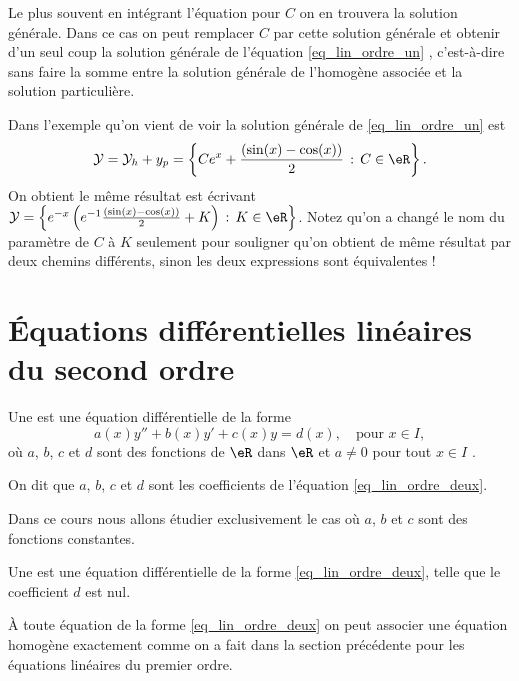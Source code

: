 \begin{remark}
	Le plus souvent en intégrant l'équation pour $C$ on en trouvera la solution générale. Dans ce cas on peut remplacer $C$ par cette solution générale et obtenir d'un seul coup la solution générale de l'équation \eqref{eq_lin_ordre_un} , c'est-à-dire sans faire la somme entre la solution générale de l'homogène associée et la solution particulière.

	\begin{example}
		Dans l'exemple qu'on vient de voir la solution générale de \eqref{eq_lin_ordre_un} est
		\begin{equation}
			\mathcal{Y} = \mathcal{Y}_h + y_p = \left\{Ce^x + \frac{(\sin(x)-\cos(x))}{2} \,:\, C\in\eR\right\}.
		\end{equation}
		On obtient le m\^eme résultat est écrivant $\mathcal{Y} = \left\{e^{-x}\left(e^{-1}\frac{(\sin(x)-\cos(x))}{2} +K \right) \,:\, K\in\eR\right\}$. Notez qu'on a changé le nom du paramètre de $C$ à $K$ seulement pour souligner qu'on obtient de m\^eme résultat par deux chemins différents, sinon les deux expressions sont équivalentes !
	\end{example}
\end{remark}

\section{Équations différentielles linéaires du second ordre}
\label{Secordredeux}

\begin{definition}
	Une   est une équation différentielle de la forme
	\begin{equation}\label{eq_lin_ordre_deux}
		a(x)y'' + b(x) y' + c(x)y = d(x), \quad\text{pour } x\in I,
	\end{equation}
	o\`u $a$, $b$, $c$ et $d$ sont des fonctions de $\eR$ dans $\eR$ et $a\neq 0$ pour tout $x\in I$ .

	On dit que $a$, $b$, $c$ et $d$ sont les coefficients de l'équation \eqref{eq_lin_ordre_deux}.
\end{definition}
Dans ce cours nous allons étudier exclusivement le cas où $a$, $b$ et $c$ sont des fonctions constantes.
\begin{definition}
	Une   est une équation différentielle de la forme \eqref{eq_lin_ordre_deux}, telle que le coefficient $d$ est nul.
\end{definition}
À toute équation de la forme \eqref{eq_lin_ordre_deux} on peut associer une équation homogène exactement comme on a fait dans la section précédente pour les équations linéaires du premier ordre.

